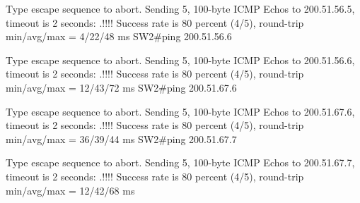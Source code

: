 \documentclass[10pt]{article}
\begin{document}
\begin{itemize}
\begin{verbatim*}
		Type escape sequence to abort.
		Sending 5, 100-byte ICMP Echos to 200.51.56.5, timeout is 2 seconds:
		.!!!!
		Success rate is 80 percent (4/5), round-trip min/avg/max = 4/22/48 ms
		SW2#ping 200.51.56.6

		Type escape sequence to abort.
		Sending 5, 100-byte ICMP Echos to 200.51.56.6, timeout is 2 seconds:
		.!!!!
		Success rate is 80 percent (4/5), round-trip min/avg/max = 12/43/72 ms
		SW2#ping 200.51.67.6

		Type escape sequence to abort.
		Sending 5, 100-byte ICMP Echos to 200.51.67.6, timeout is 2 seconds:
		.!!!!
		Success rate is 80 percent (4/5), round-trip min/avg/max = 36/39/44 ms
		SW2#ping 200.51.67.7

		Type escape sequence to abort.
		Sending 5, 100-byte ICMP Echos to 200.51.67.7, timeout is 2 seconds:
		.!!!!
		Success rate is 80 percent (4/5), round-trip min/avg/max = 12/42/68 ms
	\end{verbatim*}
\end{itemize}
\end{document}
